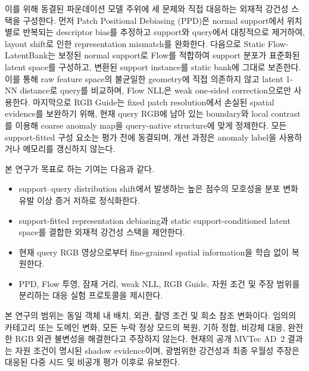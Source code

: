 이를 위해 동결된 파운데이션 모델 주위에 세 문제와 직접 대응하는 외재적
강건성 스택을 구성한다. 먼저 Patch Positional Debiasing (PPD)은 normal support에서 위치별로 반복되는
descriptor bias를 추정하고 support와 query에서 대칭적으로 제거하여, layout
shift로 인한 representation mismatch를 완화한다. 다음으로 Static
Flow-LatentBank는 보정된 normal support로 Flow를 적합하여 support 분포가
표준화된 latent space를 구성하고, 변환된 support instance를 static bank에
그대로 보존한다. 이를 통해 raw feature space의 불균일한 geometry에 직접
의존하지 않고 latent 1-NN distance로 query를 비교하며, Flow NLL은 weak
one-sided correction으로만 사용한다. 마지막으로 RGB Guide는 fixed patch
resolution에서 손실된 spatial evidence를 보완하기 위해, 현재 query RGB에
남아 있는 boundary와 local contrast를 이용해 coarse anomaly map을
query-native structure에 맞게 정제한다.
모든 support-fitted 구성 요소는 평가 전에 동결되며, 개선 과정은 anomaly label을
사용하거나 메모리를 갱신하지 않는다.

본 연구가 목표로 하는 기여는 다음과 같다.
\begin{itemize}
  \item support--query distribution shift에서 발생하는 높은 점수의 모호성을 분포 변화
        유발 이상 증거 저하로 정식화한다.
  \item support-fitted representation debiasing과 static support-conditioned latent space를 결합한
        외재적 강건성 스택을 제안한다.
  \item 현재 query RGB 영상으로부터 fine-grained spatial information을 학습 없이 복원한다.
  \item PPD, Flow 투영, 잠재 거리, weak NLL, RGB Guide, 자원 조건 및
        주장 범위를 분리하는 대응 실험 프로토콜을 제시한다.
\end{itemize}

본 연구의 범위는 동일 객체 내 배치, 외관, 촬영 조건 및 희소 참조 변화이다.
임의의 카테고리 또는 도메인 변화, 모든 누락 정상 모드의 복원, 기하 정합,
비강체 대응, 완전한 RGB 외관 불변성을 해결한다고 주장하지 않는다. 현재의
공개 MVTec AD~2 결과는 자원 조건이 명시된 shadow evidence이며, 광범위한
강건성과 최종 우월성 주장은 대응된 다중 시드 및 비공개 평가 이후로 유보한다.
